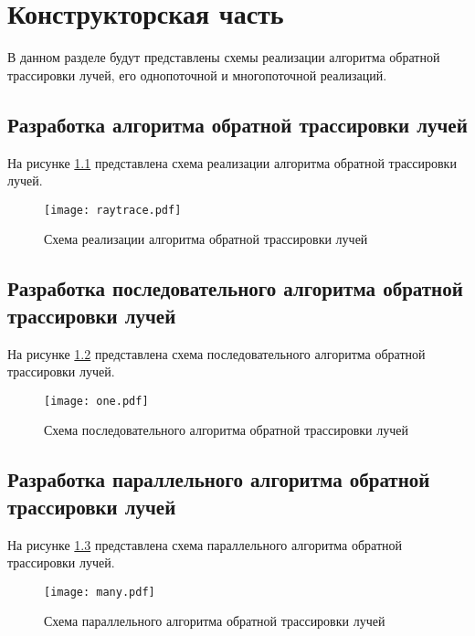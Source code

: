 \chapter{Конструкторская часть}

В данном разделе будут представлены схемы реализации алгоритма обратной трассировки лучей, его однопоточной и многопоточной реализаций.

\section{Разработка алгоритма обратной трассировки лучей}
На рисунке \ref{img:raytrace} представлена схема реализации алгоритма обратной трассировки лучей.

\begin{figure}[h!]
    \centering
    \texttt{[image: raytrace.pdf]}
    \caption{Схема реализации алгоритма обратной трассировки лучей}
    \label{img:raytrace}
\end{figure}

\section{Разработка последовательного алгоритма обратной трассировки лучей}
На рисунке \ref{img:one} представлена схема последовательного алгоритма обратной трассировки лучей.

\begin{figure}[h!]
    \centering
    \texttt{[image: one.pdf]}
    \caption{Схема последовательного алгоритма обратной трассировки лучей}
    \label{img:one}
\end{figure}

\section{Разработка параллельного алгоритма обратной трассировки лучей}
На рисунке \ref{img:many} представлена схема параллельного алгоритма обратной трассировки лучей.

\begin{figure}[h!]
    \centering
    \texttt{[image: many.pdf]}
    \caption{Схема параллельного алгоритма обратной трассировки лучей}
    \label{img:many}
\end{figure}

\newpage
